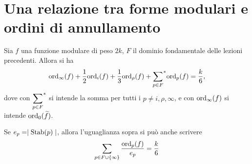 
\section{Una relazione tra forme modulari e ordini di annullamento}

\begin{teorema} \label{170201-forme-ordini}
	Sia $f$ una funzione modulare di peso $2k$, $F$ il dominio fondamentale delle lezioni precedenti. Allora si ha
	\begin{equation*}
	\text{ord}_\infty(f)+\frac{1}{2}\text{ord}_i(f)+\frac{1}{3}\text{ord}_{\rho}(f)+{\sum_{p\in F}}^{*}\text{ord}_p(f)=\frac{k}{6},
	\end{equation*}
	dove con $\displaystyle{\sum_{p\in F}}^{*}$ si intende la somma per tutti i $p \neq i, \rho, \infty$, e con $\text{ord}_\infty(f)$ si intende $\text{ord}_0(\widetilde{f})$.
	
	Se $e_p=\mid \text{Stab}(p) \mid$, allora l'uguaglianza sopra si può anche scrivere
	\begin{equation*}
		\sum_{p\in F \cup \{\infty\}} \frac{\text{ord}_p(f)}{e_p}=\frac{k}{6}
	\end{equation*}
\end{teorema}

